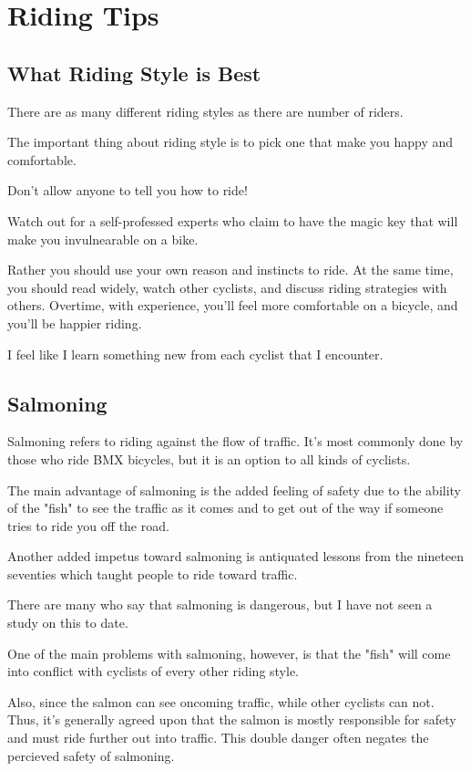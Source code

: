 \chapter{Riding Tips}

\section{What Riding Style is Best}

There are as many different riding styles as there are number of riders.

The important thing about riding style is to pick one that make you happy and comfortable.

Don't allow anyone to tell you how to ride!

Watch out for a self-professed experts who claim to have the magic key that will make you invulnearable on a bike.

Rather you should use your own reason and instincts to ride. At the same time,
you should read widely, watch other cyclists, and discuss riding strategies
with others. Overtime, with experience, you'll feel more comfortable on a
bicycle, and you'll be happier riding.

I feel like I learn something new from each cyclist that I encounter. 

\section{Salmoning}

Salmoning refers to riding against the flow of traffic. It's most commonly done
by those who ride BMX bicycles, but it is an option to all kinds of cyclists.

The main advantage of salmoning is the added feeling of safety due to the
ability of the "fish" to see the traffic as it comes and to get out of the way
if someone tries to ride you off the road.

Another added impetus toward salmoning is antiquated lessons from the
nineteen seventies which taught people to ride toward traffic.  

There are many who say that salmoning is dangerous, but I have not seen a study on this to date.

One of the main problems with salmoning, however, is that the "fish" will come
into conflict with cyclists of every other riding style. 

Also, since the salmon can see oncoming traffic, while other cyclists can not.
Thus, it's generally agreed upon that the salmon is mostly responsible for
safety and must ride further out into traffic. This double danger often negates
the percieved safety of salmoning. 

